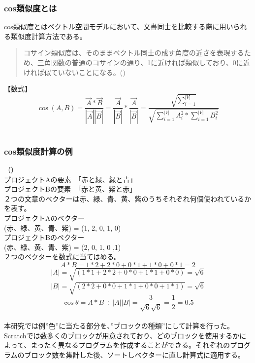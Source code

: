 \documentclass[a4paper,10pt,onecolumn,oneside,openany]{jsbook}
\begin{document}
\subsubsection{cos類似度とは}
cos類似度とはベクトル空間モデルにおいて、文書同士を比較する際に用いられる類似度計算方法である。
\begin{quote}
コサイン類似度は、そのままベクトル同士の成す角度の近さを表現するため、三角関数の普通のコサインの通り、1に近ければ類似しており、0に近ければ似ていないことになる。(\cite{cos})
\end{quote}
【数式】
\begin{equation}
\cos(A,B) = \frac{\vec{A} \ast\vec{B}} {|\vec{A}||\vec{B}|}  = \frac{\vec{A}}{|\vec{B}|}\ast\frac{\vec{A}}{|\vec{B}|} = \frac{\sqrt {\sum_{i=1}^{|V|}}}{\sqrt{\sum_{i=1}^{|V|}A_i^2\ast\sum_{i=1}^{|V|}B_i^2}}
\end{equation}
\\
\subsubsection{cos類似度計算の例}（\cite{tf_idf_cos}）
\\プロジェクトAの要素　「赤と緑、緑と青」
\\プロジェクトBの要素　「赤と黄、紫と赤」
\\２つの文章のベクターは赤、緑、青、黄、紫のうちそれぞれ何個使われているかを表す。
\\プロジェクトAのベクター
\\(赤、緑、黄、青、紫) = (1, 2, 0, 1, 0)
\\プロジェクトBのベクター
\\(赤、緑、黄、青、紫) = (2, 0, 1, 0 ,1)
\\２つのベクターを数式に当てはめる。
\begin{equation}
A \ast B = 1 \ast 2 + 2 \ast 0 + 0 \ast 1 + 1 \ast 0 + 0 \ast 1 = 2
\end{equation}
\begin{equation}
|A| = \sqrt{( 1 \ast 1 + 2 \ast 2 + 0 \ast 0 + 1 \ast 1 + 0 \ast 0 )} = \sqrt{6}
\end{equation}
\begin{equation}
|B| = \sqrt{( 2 \ast 2 + 0 \ast 0 + 1 \ast 1 + 0 \ast 0 + 1 \ast 1 )} = \sqrt{6}
\end{equation}
\begin{equation}
\cos\theta = A \ast B \div |A| |B| = \frac{3}{\sqrt{6}\sqrt{6}} = \frac{1}{2} = 0.5
\end{equation}
\\本研究では例”色”に当たる部分を、”ブロックの種類”にして計算を行った。Scratchでは数多くのブロックが用意されており、どのブロックを使用するかによって、まったく異なるプログラムを作成することができる。それぞれのプログラムのブロック数を集計した後、ソートしベクターに直し計算式に適用する。
\end{document}
